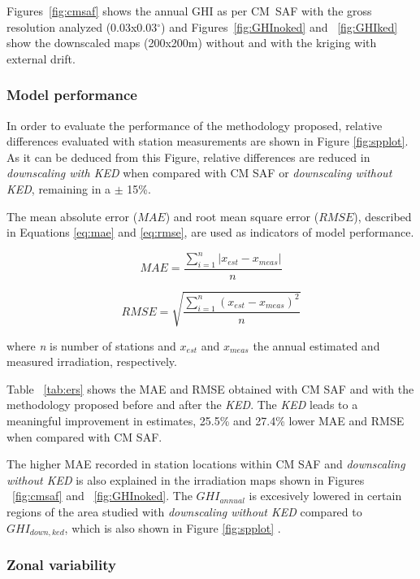 \documentclass[authoryear, sort&compress]{elsarticle}
\begin{document}
Figures~\ref{fig:cmsaf} shows the annual GHI as per CM~SAF with the
gross resolution analyzed (0.03x0.03$^\circ$) and
Figures~\ref{fig:GHInoked} and ~\ref{fig:GHIked} show the downscaled
maps (200x200m) without and with the kriging with external drift.


\subsubsection{Model performance}
\label{sec:error}

In order to evaluate the performance of the methodology proposed,
relative differences evaluated with station measurements are shown in
Figure \ref{fig:spplot}. As it can be deduced from this Figure,
relative differences are reduced in \emph{downscaling with KED} when
compared with CM SAF or \emph{downscaling without KED}, remaining in a
$\pm$ 15\%.

The mean absolute error ($MAE$) and root mean square error ($RMSE$),
described in Equations \ref{eq:mae} and \ref{eq:rmse}, are used as
indicators of model performance.

\begin{equation}
\label{eq:mae}
MAE=\frac{\sum_{i=1}^n{\left |{x_{est}-x_{meas}}\right |}}{n} 
\end{equation}

\begin{equation}
\label{eq:rmse}
RMSE=\sqrt{\frac{\sum_{i=1}^n{(x_{est}-x_{meas})^2}}{n}}
\end{equation}

where \emph{n} is number of stations and $x_{est}$ and $x_{meas}$ the
annual estimated and measured irradiation, respectively.

Table ~\ref{tab:ers} shows the MAE and RMSE obtained with CM SAF and
with the methodology proposed before and after the \emph{KED}. The
\emph{KED} leads to a meaningful improvement in estimates, 25.5\% and
27.4\% lower MAE and RMSE when compared with CM SAF.

The higher MAE recorded in station locations within CM SAF and
\emph{downscaling without KED} is also explained in the irradiation
maps shown in Figures ~\ref{fig:cmsaf} and ~\ref{fig:GHInoked}. The
$GHI_{annual}$ is excesively lowered in certain regions of the area
studied with \emph{downscaling without KED} compared to
$GHI_{down,ked}$, which is also shown in Figure \ref{fig:spplot} .


\subsubsection{Zonal variability}
\label{sec:zonal-variation}
\end{document}
